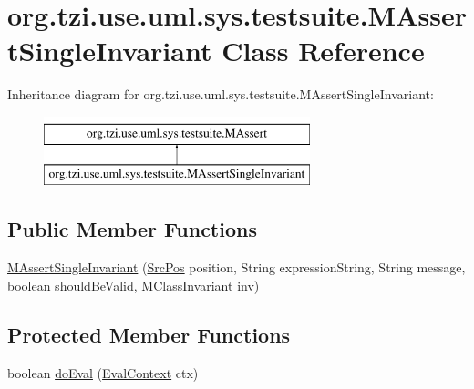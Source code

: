 \hypertarget{classorg_1_1tzi_1_1use_1_1uml_1_1sys_1_1testsuite_1_1_m_assert_single_invariant}{\section{org.\-tzi.\-use.\-uml.\-sys.\-testsuite.\-M\-Assert\-Single\-Invariant Class Reference}
\label{classorg_1_1tzi_1_1use_1_1uml_1_1sys_1_1testsuite_1_1_m_assert_single_invariant}
}
Inheritance diagram for org.\-tzi.\-use.\-uml.\-sys.\-testsuite.\-M\-Assert\-Single\-Invariant\-:\begin{figure}[H]
\begin{center}
\leavevmode
\includegraphics[height=2.000000cm]{classorg_1_1tzi_1_1use_1_1uml_1_1sys_1_1testsuite_1_1_m_assert_single_invariant}
\end{center}
\end{figure}
\subsection*{Public Member Functions}
\begin{DoxyCompactItemize}
\item 
\hyperlink{classorg_1_1tzi_1_1use_1_1uml_1_1sys_1_1testsuite_1_1_m_assert_single_invariant_a6ddc30701c83d58b8a8b93b7a6089e45}{M\-Assert\-Single\-Invariant} (\hyperlink{classorg_1_1tzi_1_1use_1_1parser_1_1_src_pos}{Src\-Pos} position, String expression\-String, String message, boolean should\-Be\-Valid, \hyperlink{classorg_1_1tzi_1_1use_1_1uml_1_1mm_1_1_m_class_invariant}{M\-Class\-Invariant} inv)
\end{DoxyCompactItemize}
\subsection*{Protected Member Functions}
\begin{DoxyCompactItemize}
\item 
boolean \hyperlink{classorg_1_1tzi_1_1use_1_1uml_1_1sys_1_1testsuite_1_1_m_assert_single_invariant_a9e435efb7458fb0096e2d553542a36a6}{do\-Eval} (\hyperlink{classorg_1_1tzi_1_1use_1_1uml_1_1ocl_1_1expr_1_1_eval_context}{Eval\-Context} ctx)
\end{DoxyCompactItemize}



